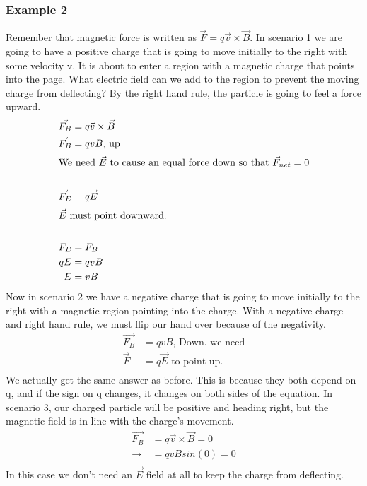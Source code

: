     \subsubsection{Example 2}
    Remember that magnetic force is written as $\vec{F}=q\vec{v}\times\vec{B}$. In scenario 1 we are going to have a positive charge that is going to move initially to the right with some velocity v. It is about to enter a region with a magnetic charge that points into the page. What electric field can we add to the region to prevent the moving charge from deflecting? By the right hand rule, the particle is going to feel a force upward.
    \begin{align*}
        \vec{F_B}&=q\vec{v}\times\vec{B}\\
        \vec{F_B}&=qvB \text{, up}\\
        \shortintertext{We need $\vec{E}$ to cause an equal force down so that $\vec{F}_{net}=0$}\\
        \vec{F_E}&=q\vec{E}\\
        \shortintertext{$\vec{E}$ must point downward.}\\
        F_E&=F_B\\
        qE&=qvB\\
        E&=vB\\
    \end{align*}
    Now in scenario 2 we have a negative charge that is going to move initially to the right with a magnetic region pointing into the charge. With a negative charge and right hand rule, we must flip our hand over because of the negativity.
    \begin{align*}
        \vec{F_B}&=qvB\text{, Down. we need}\\
        \vec{F}&=q\vec{E} \text{ to point up.}\\
    \end{align*}
    We actually get the same answer as before. This is because they both depend on q, and if the sign on q changes, it changes on both sides of the equation.\newline\newline 
    In scenario 3, our charged particle will be positive and heading right, but the magnetic field is in line with the charge's movement.
    \begin{align*}
        \vec{F_B}&=q\vec{v}\times\vec{B}=0\\
        \to &=qvBsin(0)=0\\
    \end{align*}
    In this case we don't need an $\vec{E}$ field at all to keep the charge from deflecting.\newline\newline

